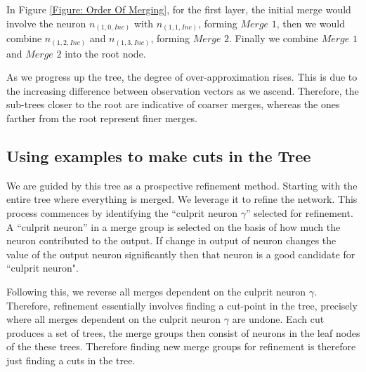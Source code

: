 In Figure \ref{Figure: Order Of Merging}, for the first layer, the initial 
merge would involve the neuron $n_{(1, 0, Inc)}$ with $n_{(1, 1, Inc)}$, 
forming $\textit{Merge 1}$, then we would combine $n_{(1, 2, Inc)}$ and 
$n_{(1, 3, Inc)}$, forming $\textit{Merge 2}$. Finally we combine 
$\textit{Merge 1}$ and $\textit{Merge 2}$ into the root node. 

As we progress up the tree, the degree of over-approximation rises. 
This is due to the increasing difference between observation vectors as 
we ascend. Therefore, the sub-trees closer to the root are indicative of 
coarser merges, whereas the ones farther from the root represent finer merges. 


\subsection{Using examples to make cuts in the Tree} 
We are guided by this tree as a prospective refinement method. Starting with the 
entire tree where everything is merged. We leverage it to refine the network.
This process commences by identifying the ``culprit neuron $\gamma$'' 
selected for refinement. A ``culprit neuron'' in a merge group is selected 
on the basis of how much the neuron contributed to the output. If change in 
output of  neuron changes the value of the output neuron significantly then
that neuron is a good candidate for ``culprit neuron". 

Following this, we reverse all merges dependent on the culprit 
neuron $\gamma$. Therefore, refinement essentially involves finding a 
cut-point in the tree, precisely where all merges dependent on the 
culprit neuron $\gamma$ are undone. Each cut produces a set of trees, 
the merge groups then consist of neurons in the leaf nodes of the  these trees.
Therefore finding new merge groups for refinement is therefore just finding a 
cuts in the tree.


